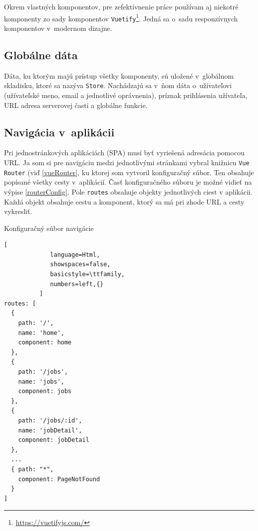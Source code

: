 \documentclass[zadani,slovak]{fitthesis}
\begin{document}
\noindent
Okrem vlastných komponentov, pre zefektívnenie práce používam aj niekotré komponenty zo sady komponentov \texttt{Vuetify}\footnote{\url{https://vuetifyjs.com/}}. Jedná sa o~sadu responzívnych komponentov v~modernom dizajne.

\subsection{Globálne dáta}
Dáta, ku ktorým majú prístup všetky komponenty, sú uložené v~globálnom skladisku, ktoré sa nazýva \texttt{Store}. Nachádzajú sa v~ňom dáta o~užívateľovi (užívateľské meno, email a jednotlivé oprávnenia), príznak prihlásenia užívateľa, URL adresa serverovej časti a globálne funkcie.

\subsection{Navigácia v~aplikácii}
Pri jednostránkových aplikáciách (SPA) musí byť vyriešená adresácia pomocou URL. Ja som si pre navigáciu medzi jednotlivými stránkami vybral knižnicu \texttt{Vue Router} (viď \ref{vueRouter}, ku ktorej som vytvoril konfiguračný súbor. Ten obsahuje popísané všetky cesty v~aplikácií. Časť konfiguračného súboru je možné vidieť na výpise \ref{routerConfig}. Pole \texttt{routes} obsahuje objekty jednotlivých ciest v aplikácii. Každá objekt obsahuje cestu a komponent, ktorý sa má pri zhode URL a cesty vykresliť.

\begin{algorithm}[H]
  \caption{Konfiguračný súbor navigácie}
  \label{routerConfig}
  \begin{lstlisting}[
             language=Html,
             showspaces=false,
             basicstyle=\ttfamily,
             numbers=left,{}
          ]
routes: [
  {
    path: '/',
    name: 'home',
    component: home
  },
  {
    path: '/jobs',
    name: 'jobs',
    component: jobs
  },
  {
    path: '/jobs/:id',
    name: 'jobDetail',
    component: jobDetail
  },
  ...
  { path: "*",
    component: PageNotFound
  }
]
  \end{lstlisting}
\end{algorithm}
\end{document}
